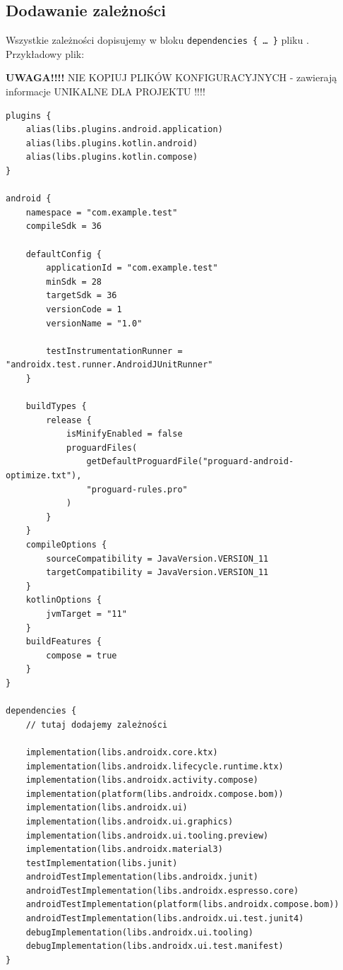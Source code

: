 \subsection{Dodawanie zależności}
Wszystkie zależności dopisujemy w bloku \texttt{dependencies \{ … \}} pliku . Przykładowy plik:

\textbf{UWAGA!!!!} NIE KOPIUJ PLIKÓW KONFIGURACYJNYCH - zawierają informacje UNIKALNE DLA PROJEKTU !!!!

\begin{verbatim}
plugins {
    alias(libs.plugins.android.application)
    alias(libs.plugins.kotlin.android)
    alias(libs.plugins.kotlin.compose)
}

android {
    namespace = "com.example.test"
    compileSdk = 36

    defaultConfig {
        applicationId = "com.example.test"
        minSdk = 28
        targetSdk = 36
        versionCode = 1
        versionName = "1.0"

        testInstrumentationRunner = "androidx.test.runner.AndroidJUnitRunner"
    }

    buildTypes {
        release {
            isMinifyEnabled = false
            proguardFiles(
                getDefaultProguardFile("proguard-android-optimize.txt"),
                "proguard-rules.pro"
            )
        }
    }
    compileOptions {
        sourceCompatibility = JavaVersion.VERSION_11
        targetCompatibility = JavaVersion.VERSION_11
    }
    kotlinOptions {
        jvmTarget = "11"
    }
    buildFeatures {
        compose = true
    }
}

dependencies {
    // tutaj dodajemy zależności

    implementation(libs.androidx.core.ktx)
    implementation(libs.androidx.lifecycle.runtime.ktx)
    implementation(libs.androidx.activity.compose)
    implementation(platform(libs.androidx.compose.bom))
    implementation(libs.androidx.ui)
    implementation(libs.androidx.ui.graphics)
    implementation(libs.androidx.ui.tooling.preview)
    implementation(libs.androidx.material3)
    testImplementation(libs.junit)
    androidTestImplementation(libs.androidx.junit)
    androidTestImplementation(libs.androidx.espresso.core)
    androidTestImplementation(platform(libs.androidx.compose.bom))
    androidTestImplementation(libs.androidx.ui.test.junit4)
    debugImplementation(libs.androidx.ui.tooling)
    debugImplementation(libs.androidx.ui.test.manifest)
}
\end{verbatim}

